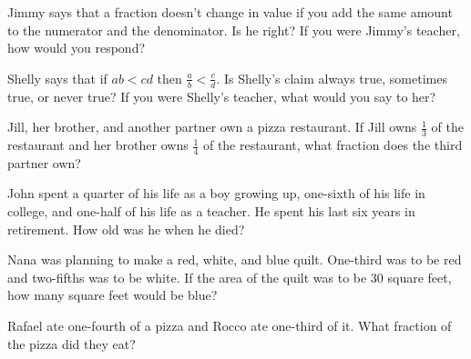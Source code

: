 \begin{problem}
Jimmy says that a fraction doesn't change in value if you add the same amount to the numerator and the denominator.  Is he right?  If you were Jimmy's teacher, how would you respond?

\end{problem}


\begin{problem}
Shelly says that if $ab < cd$ then $\frac a b< \frac c d$.  Is Shelly's claim always true, sometimes true, or never true?  If you were Shelly's teacher, what would you say to her?

\end{problem}



 \begin{problem}
Jill, her brother, and another partner own a pizza restaurant.  If Jill owns $\frac 1 3$ of the restaurant and her brother owns $\frac 1 4$ of the restaurant, what fraction does the third partner own?
\end{problem}
 


\begin{problem}
John spent a quarter of his life as a boy growing up, one-sixth of his life in college, and one-half of his life as a teacher.  He spent his last six years in retirement.  How old was he when he died?
\end{problem}

\begin{problem}
Nana was planning to make a red, white, and blue quilt.
One-third was to be red and two-fifths was to be white. If
the area of the quilt was to be 30 square feet, how many
square feet would be blue?
\end{problem}

\begin{problem}
 Rafael ate one-fourth of a pizza and Rocco ate one-third of it.  What fraction of the pizza did they eat?
\end{problem}


